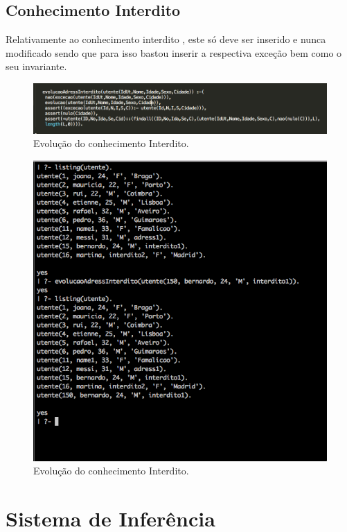 \documentclass[25pt]{article}
\begin{document}
\subsection{Conhecimento Interdito}

Relativamente ao conhecimento interdito , este só deve ser inserido e nunca modificado sendo que para isso bastou 
inserir a respectiva exceção bem como o seu invariante.

\begin{figure}[H]
\centering\includegraphics[scale=0.55]{adressInter}
\caption{\label{fig:controller} Evolução do conhecimento Interdito.}
\end{figure}


\begin{figure}[H]
\centering\includegraphics[scale=0.55]{interditooo}
\caption{\label{fig:controller} Evolução do conhecimento Interdito.}
\end{figure}

\section{Sistema de Inferência}
\end{document}
